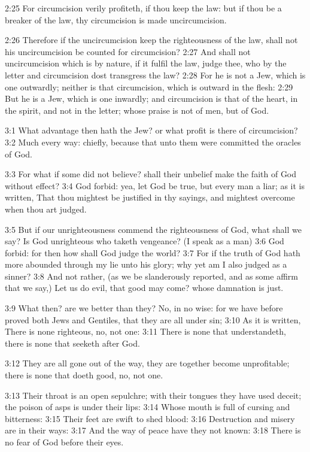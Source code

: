 2:25 For circumcision verily profiteth, if thou keep the law: but if
thou be a breaker of the law, thy circumcision is made uncircumcision.

2:26 Therefore if the uncircumcision keep the righteousness of the
law, shall not his uncircumcision be counted for circumcision?  2:27
And shall not uncircumcision which is by nature, if it fulfil the law,
judge thee, who by the letter and circumcision dost transgress the
law?  2:28 For he is not a Jew, which is one outwardly; neither is
that circumcision, which is outward in the flesh: 2:29 But he is a
Jew, which is one inwardly; and circumcision is that of the heart, in
the spirit, and not in the letter; whose praise is not of men, but of
God.

3:1 What advantage then hath the Jew? or what profit is there of
circumcision?  3:2 Much every way: chiefly, because that unto them
were committed the oracles of God.

3:3 For what if some did not believe? shall their unbelief make the
faith of God without effect?  3:4 God forbid: yea, let God be true,
but every man a liar; as it is written, That thou mightest be
justified in thy sayings, and mightest overcome when thou art judged.

3:5 But if our unrighteousness commend the righteousness of God, what
shall we say? Is God unrighteous who taketh vengeance? (I speak as a
man) 3:6 God forbid: for then how shall God judge the world?  3:7 For
if the truth of God hath more abounded through my lie unto his glory;
why yet am I also judged as a sinner?  3:8 And not rather, (as we be
slanderously reported, and as some affirm that we say,) Let us do
evil, that good may come? whose damnation is just.

3:9 What then? are we better than they? No, in no wise: for we have
before proved both Jews and Gentiles, that they are all under sin;
3:10 As it is written, There is none righteous, no, not one: 3:11
There is none that understandeth, there is none that seeketh after
God.

3:12 They are all gone out of the way, they are together become
unprofitable; there is none that doeth good, no, not one.

3:13 Their throat is an open sepulchre; with their tongues they have
used deceit; the poison of asps is under their lips: 3:14 Whose mouth
is full of cursing and bitterness: 3:15 Their feet are swift to shed
blood: 3:16 Destruction and misery are in their ways: 3:17 And the way
of peace have they not known: 3:18 There is no fear of God before
their eyes.

